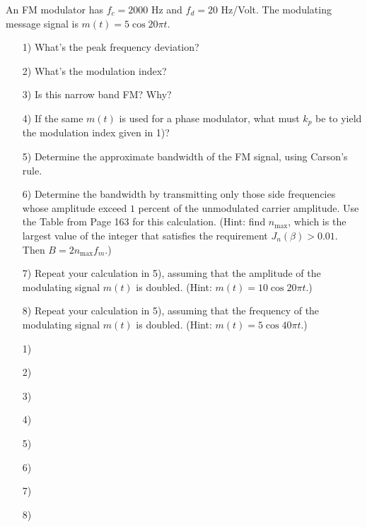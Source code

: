 \documentclass{assignment}
\begin{document}
\begin{prob}
    An FM modulator has $f_c=2000$ Hz and $f_d=20$ Hz/Volt. The modulating message signal is $m(t)=5\cos 20\pi t$.
    \begin{itemize}
        \item[1)] What's the peak frequency deviation?
        \item[2)] What's the modulation index?
        \item[3)] Is this narrow band FM? Why?
        \item[4)] If the same $m(t)$ is used for a phase modulator, what must $k_p$ be to yield the modulation index given in 1)?
        \item[5)] Determine the approximate bandwidth of the FM signal, using Carson's rule.
        \item[6)] Determine the bandwidth by transmitting only those side frequencies whose amplitude exceed $1$ percent of the unmodulated carrier amplitude. Use the Table from Page 163 for this calculation. (Hint: find $n_{\max}$, which is the largest value of the integer that satisfies the requirement $J_n(\beta)>0.01$. Then $B=2n_{\max}f_m$.)
        \item[7)] Repeat your calculation in 5), assuming that the amplitude of the modulating signal $m(t)$ is doubled. (Hint: $m(t)=10\cos 20\pi t$.)
        \item[8)] Repeat your calculation in 5), assuming that the frequency of the modulating signal $m(t)$ is doubled. (Hint: $m(t)=5\cos 40\pi t$.)
    \end{itemize}
\end{prob}
\begin{sol}
    \begin{itemize}
        \item[1)] 
        \item[2)] 
        \item[3)] 
        \item[4)] 
        \item[5)] 
        \item[6)] 
        \item[7)] 
        \item[8)] 
    \end{itemize}
\end{sol}
\end{document}
